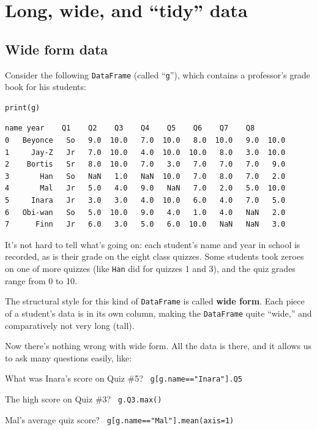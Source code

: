 \chapter{Long, wide, and ``tidy'' data}

\section{Wide form data}

Consider the following \texttt{DataFrame} (called ``\texttt{g}''), which
contains a professor's grade book for his students:

\begin{Verbatim}[fontsize=\small,samepage=true,frame=single,framesep=3mm]
print(g)
\end{Verbatim}
\vspace{-.2in}

\begin{Verbatim}[fontsize=\footnotesize,samepage=true,frame=leftline,framesep=3mm,framerule=1mm]
       name year    Q1    Q2    Q3    Q4    Q5    Q6    Q7    Q8
0   Beyonce   So   9.0  10.0   7.0  10.0   8.0  10.0   9.0  10.0
1     Jay-Z   Jr   7.0  10.0   4.0  10.0  10.0   8.0   3.0  10.0
2    Bortis   Sr   8.0  10.0   7.0   3.0   7.0   7.0   7.0   9.0
3       Han   So   NaN   1.0   NaN  10.0   7.0   8.0   7.0   2.0
4       Mal   Jr   5.0   4.0   9.0   NaN   7.0   2.0   5.0  10.0
5     Inara   Jr   3.0   3.0   4.0  10.0   6.0   4.0   7.0   5.0
6   Obi-wan   So   5.0  10.0   9.0   4.0   1.0   4.0   NaN   2.0
7      Finn   Jr   6.0   3.0   5.0   6.0  10.0   NaN   NaN   3.0
\end{Verbatim}

It's not hard to tell what's going on: each student's name and year in school
is recorded, as is their grade on the eight class quizzes. Some students took
zeroes on one of more quizzes (like \texttt{Han} did for quizzes 1 and 3), and
the quiz grades range from 0 to 10.


The structural style for this kind of \texttt{DataFrame} is called \textbf{wide
form}. Each piece of a student's data is in its own column, making the
\texttt{DataFrame} quite ``wide,'' and comparatively not very long (tall).

Now there's nothing wrong with wide form. All the data is there, and it allows
us to ask many questions easily, like:

\begin{compactitem}
\small
\item[\leftthumbsup] What was Inara's score on Quiz \#5? \ \texttt{g[g.name=="Inara"].Q5}
\item[\leftthumbsup] The high score on Quiz \#3? \ \texttt{g.Q3.max()}
\item[\leftthumbsup] Mal's average quiz score? \ 
\texttt{g[g.name=="Mal"].mean(axis=1)}
\end{compactitem}

